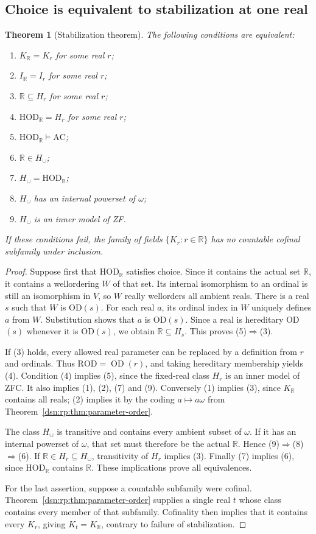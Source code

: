 \documentclass[11pt,a4paper]{article}
\numberwithin{equation}{section}
\newtheorem{theorem}{Theorem}[section]
\theoremstyle{definition}
\theoremstyle{remark}
\newcommand{\HOD}{\mathrm{HOD}}
\newcommand{\R}{\mathbb R}
\newcommand{\ROD}{\mathrm{ROD}}
\newcommand{\HR}{\HOD_{\R}}
\newcommand{\KR}{K_{\R}}
\newcommand{\IR}{I_{\R}}
\newcommand{\Hcup}{H_{\cup}}
\begin{document}
\subsection{Choice is equivalent to stabilization at one real}

\begin{theorem}[Stabilization theorem]
\label{dsn:rp:thm:stabilization}
The following conditions are equivalent:
\begin{enumerate}
\item $\KR=K_r$ for some real $r$;
\item $\IR=I_r$ for some real $r$;
\item $\mathbb R\subseteq H_r$ for some real $r$;
\item $\HR=H_r$ for some real $r$;
\item $\HR\models\mathrm{AC}$;
\item $\mathbb R\in \Hcup$;
\item $\Hcup=\HR$;
\item $\Hcup$ has an internal powerset of $\omega$;
\item $\Hcup$ is an inner model of ZF.
\end{enumerate}
If these conditions fail, the family of fields $\{K_r:r\in\mathbb R\}$
has no countable cofinal subfamily under inclusion.
\end{theorem}
\begin{proof}
Suppose first that $\HR$ satisfies choice.  Since it contains
the actual set $\mathbb R$, it contains a wellordering $W$ of that set.
Its internal isomorphism to an ordinal is still an isomorphism in $V$,
so $W$ really wellorders all ambient reals.  There is a real $s$ such
that $W$ is OD$(s)$.  For each real $a$, its ordinal index in $W$
uniquely defines $a$ from $W$.  Substitution shows that $a$ is OD$(s)$.
Since a real is hereditary OD$(s)$ whenever it is OD$(s)$, we obtain
$\mathbb R\subseteq H_s$.  This proves (5)$\Rightarrow$(3).

If (3) holds, every allowed real parameter can be replaced by a
definition from $r$ and ordinals.  Thus
$\ROD=\operatorname{OD}(r)$, and taking hereditary
membership yields (4).  Condition (4) implies (5), since the fixed-real
class $H_r$ is an inner model of ZFC.  It also implies (1), (2), (7)
and (9).  Conversely (1) implies (3), since $\KR$ contains
all reals; (2) implies it by the coding $a\mapsto a\omega$ from
Theorem~\ref{dsn:rp:thm:parameter-order}.

The class $\Hcup$ is transitive and contains every ambient
subset of $\omega$.  If it has an internal powerset of $\omega$, that
set must therefore be the actual $\mathbb R$.  Hence
(9)$\Rightarrow$(8)$\Rightarrow$(6).  If
$\mathbb R\in H_r\subseteq \Hcup$, transitivity of $H_r$
implies (3).  Finally (7) implies (6), since $\HR$ contains
$\mathbb R$.  These implications prove all equivalences.

For the last assertion, suppose a countable subfamily were cofinal.
Theorem~\ref{dsn:rp:thm:parameter-order} supplies a single real $t$ whose
class contains every member of that subfamily.  Cofinality then implies
that it contains every $K_r$, giving $K_t=\KR$, contrary to
failure of stabilization.
\end{proof}
\end{document}
